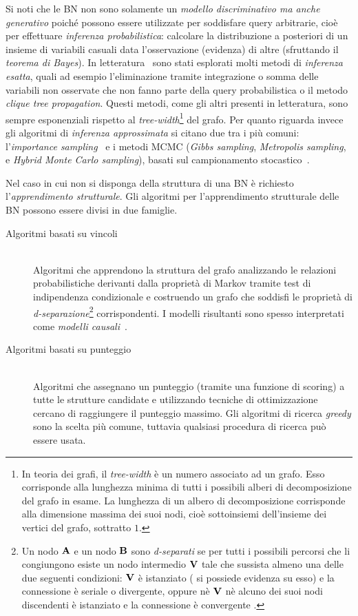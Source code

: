 Si noti che le \acl{BN} non sono solamente un \emph{modello discriminativo ma anche generativo} poiché possono essere utilizzate per soddisfare query arbitrarie, cioè per effettuare \emph{inferenza probabilistica}: calcolare la distribuzione a posteriori di un insieme di variabili casuali data l'osservazione (evidenza) di altre (sfruttando il \emph{teorema di Bayes}). In letteratura~\citep[si veda][]{Heckerman1996} sono stati esplorati molti metodi di \emph{inferenza esatta}, quali ad esempio l'eliminazione tramite integrazione o somma delle variabili non osservate che non fanno parte della query probabilistica o il metodo \emph{clique tree propagation}. Questi metodi, come gli altri presenti in letteratura, sono sempre esponenziali rispetto al \emph{tree-width}\footnote{In teoria dei grafi, il \emph{tree-width} è un numero associato ad un grafo. Esso corrisponde alla lunghezza minima di tutti i possibili alberi di decomposizione del grafo in esame. La lunghezza di un albero di decomposizione corrisponde alla dimensione massima dei suoi nodi, cioè sottoinsiemi dell'insieme dei vertici del grafo, sottratto $1$.} del grafo. Per quanto riguarda invece gli algoritmi di \emph{inferenza approssimata} si citano due tra i più comuni: l'\emph{importance sampling}~\citep{Shachter1990} e i metodi \acf{MCMC} (\emph{Gibbs sampling}, \emph{Metropolis sampling}, e \emph{Hybrid Monte Carlo sampling}), basati sul campionamento stocastico~\citep[si veda][]{Geman1984,Gilks1996,MacKay1998}.

Nel caso in cui non si disponga della struttura di una \acs{BN} è richiesto l'\emph{apprendimento strutturale}. Gli algoritmi per l'apprendimento strutturale delle \acl{BN} possono essere divisi in due famiglie.
\begin{description}
    \item[Algoritmi basati su vincoli] \hfill \\
    Algoritmi che apprendono la struttura del grafo analizzando le relazioni probabilistiche derivanti dalla proprietà di Markov tramite test di indipendenza condizionale e costruendo un grafo che soddisfi le proprietà di \emph{d-separazione}\footnote{Un nodo $\mathbf{A}$ e un nodo $\mathbf{B}$ sono \emph{d-separati} se per tutti i possibili percorsi che li congiungono esiste un nodo intermedio $\mathbf{V}$ tale che sussista almeno una delle due seguenti condizioni: $\mathbf{V}$ è istanziato (\ie{} si possiede evidenza su esso) e la connessione è seriale o divergente, oppure nè $\mathbf{V}$ nè alcuno dei suoi nodi discendenti è istanziato e la connessione è convergente \citep{Jensen2007}.} corrispondenti. I modelli risultanti sono spesso interpretati come \emph{modelli causali}~\citep{Pearl1988}.
    \item[Algoritmi basati su punteggio] \hfill \\
    Algoritmi che assegnano un punteggio (tramite una funzione di scoring) a tutte le strutture candidate e utilizzando tecniche di ottimizzazione cercano di raggiungere il punteggio massimo. Gli algoritmi di ricerca \emph{greedy} sono la scelta più comune, tuttavia qualsiasi procedura di ricerca può essere usata.
\end{description}

